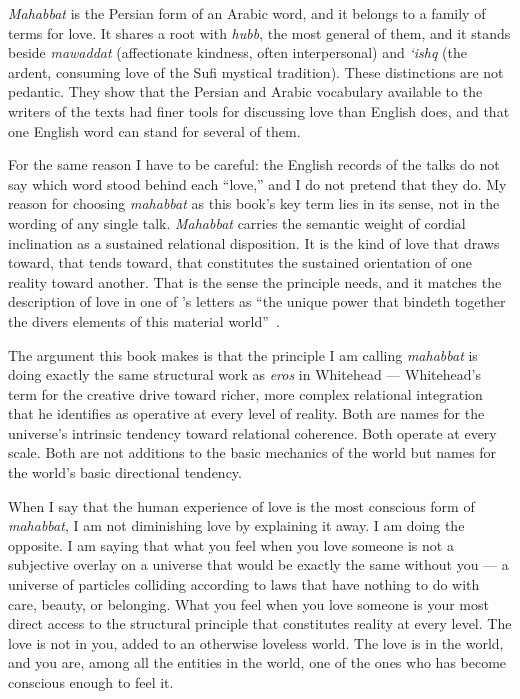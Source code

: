\textit{Mahabbat} is the Persian form of an Arabic word, and it belongs to a
family of terms for love.
It shares a root with \textit{hubb}, the most general of them, and it stands
beside \textit{mawaddat} (affectionate kindness, often interpersonal) and
\textit{`ishq} (the ardent, consuming love of the Sufi mystical tradition).
These distinctions are not pedantic.
They show that the Persian and Arabic vocabulary available to the writers of
the \bahai texts had finer tools for discussing love than English does, and
that one English word can stand for several of them.

For the same reason I have to be careful: the English records of the talks do
not say which word stood behind each ``love,'' and I do not pretend that they
do.
My reason for choosing \textit{mahabbat} as this book's key term lies in its
sense, not in the wording of any single talk.
\textit{Mahabbat} carries the semantic weight of cordial inclination as a
sustained relational disposition.
It is the kind of love that draws toward, that tends toward, that constitutes
the sustained orientation of one reality toward another.
That is the sense the principle needs, and it matches the description of love
in one of \AbdulBaha's letters as ``the unique power that bindeth together the
divers elements of this material world''~\citep[\S 12]{SelectionsAbdul}.

The argument this book makes is that the principle I am calling
\textit{mahabbat} is doing exactly the same structural work as \textit{eros}
in Whitehead --- Whitehead's term for the creative drive toward richer, more complex relational
integration that he identifies as operative at every level of reality.
Both are names for the universe's intrinsic tendency toward relational
coherence.
Both operate at every scale.
Both are not additions to the basic mechanics of the world but names for
the world's basic directional tendency.

When I say that the human experience of love is the most conscious form of
\textit{mahabbat}, I am not diminishing love by explaining it away.
I am doing the opposite.
I am saying that what you feel when you love someone is not a subjective overlay
on a universe that would be exactly the same without you --- a universe of
particles colliding according to laws that have nothing to do with care,
beauty, or belonging.
What you feel when you love someone is your most direct access to the structural
principle that constitutes reality at every level.
The love is not in you, added to an otherwise loveless world.
The love is in the world, and you are, among all the entities in the world,
one of the ones who has become conscious enough to feel it.

